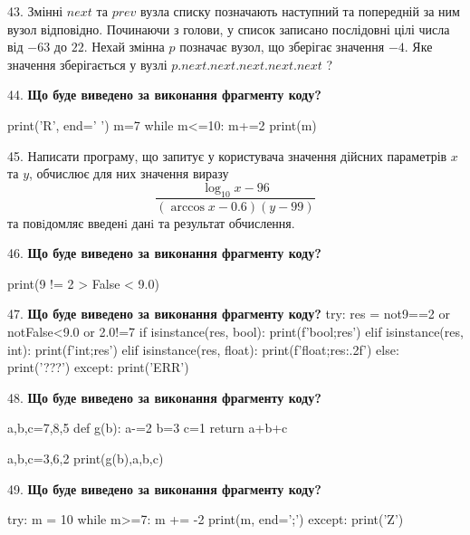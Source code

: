 \documentclass[11pt]{article}
\begin{document}
43. 
Змінні $next$ та $prev$ вузла списку позначають наступний та попередній за ним вузол відповідно. Починаючи з голови, у список записано послідовні цілі числа від $-63$ до $22$. Нехай змінна $p$ позначає вузол, що зберігає значення $-4$.
Яке значення зберігається у вузлі $p.next.next.next.next.next$ ?
\par\vspace{5mm}

44. \textbf{Що буде виведено за виконання фрагменту коду?}

print('R', end=' ')
m=7
while m<=10:
    m+=2
print(m)

\par\vspace{5mm}

45. 
Написати програму, що запитує у користувача значення дійсних параметрів $x$ та $y$, обчислює для них значення виразу 
$$\frac{\log_{10} x - 96}{(\arccos x - 0.6) (y - 99)}$$ 
та повiдомляє введенi данi та результат обчислення.

\par\vspace{5mm}

46. \textbf{Що буде виведено за виконання фрагменту коду?}

print(9 != 2 > False < 9.0)
\par\vspace{5mm}

47. \textbf{Що буде виведено за виконання фрагменту коду?}
try:
    res = not9==2 or notFalse<9.0 or 2.0!=7
    if isinstance(res, bool):
        print(f'bool;{res}')
    elif isinstance(res, int):
        print(f'int;{res}')
    elif isinstance(res, float):
        print(f'float;{res:.2f}')
    else:
        print('???')
except:
    print('ERR')
\par\vspace{5mm}

48. \textbf{Що буде виведено за виконання фрагменту коду?}

a,b,c=7,8,5
def g(b):
    a-=2
    b=3
    c=1
    return a+b+c

a,b,c=3,6,2
print(g(b),a,b,c)
\par\vspace{5mm}

49. \textbf{Що буде виведено за виконання фрагменту коду?}

try:
    m = 10
    while m>=7:
        m += -2
    print(m, end=';')
except:
    print('Z')
\end{document}
